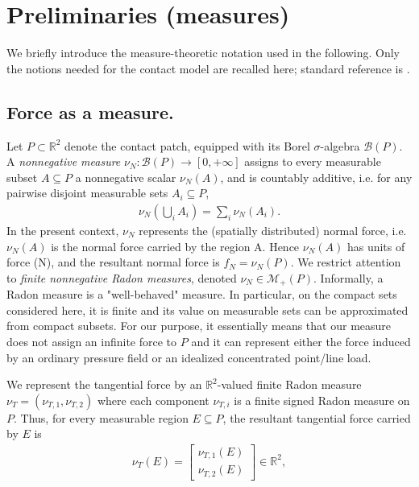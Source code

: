 \documentclass[11pt,a4paper]{article}
\theoremstyle{proposition}
\begin{document}
\section{Preliminaries (measures)}
\label{sec:measure-preliminaries}

We briefly introduce the measure-theoretic notation used in the following.
Only the notions needed for the contact model are recalled here; standard reference
is \cite{evans2015measure}.

\subsection{Force as a measure.}
Let $P\subset\mathbb R^2$ denote the contact patch, equipped with its Borel
$\sigma$-algebra $\mathcal B(P)$. A \textit{nonnegative measure} $\nu_N:\mathcal B(P)\rightarrow[0,+\infty]$ assigns to every measurable subset $A\subseteq P$ a nonnegative scalar $\nu_N(A)$, and is countably additive, i.e. for any pairwise disjoint measurable sets $A_i \subseteq P$,
\begin{align}
\nu_N\left(\bigcup_i A_i\right) =\sum_i \nu_N(A_i).
\end{align}
In the present context, $\nu_N$ represents the (spatially distributed) normal force, i.e. $\nu_N(A)$ is the normal force carried by the region A. Hence $\nu_N(A)$ has units of force (N), and the resultant normal force is $f_N=\nu_N(P)$. We restrict attention to \textit{finite nonnegative Radon measures}, denoted $\nu_N\in\mathcal M_+(P)$. Informally, a Radon measure is a "well-behaved" measure. In particular, on the compact sets considered here, it is finite and its value on measurable sets can be approximated from compact subsets. For our purpose, it essentially means that our measure does not assign an infinite force to $P$ and it can represent either the force induced by an ordinary pressure field or an idealized concentrated point/line load.

We represent the tangential force by an $\mathbb R^2$-valued finite Radon measure $\nu_T=(\nu_{T,1},\nu_{T,2})$ where each component $\nu_{T,i}$ is a finite signed Radon measure on $P$. Thus, for every measurable region $E\subseteq P$, the resultant tangential force carried by $E$ is
\begin{align}
    \nu_T(E)
    =
    \begin{bmatrix}
    \nu_{T,1}(E)\\
    \nu_{T,2}(E)
    \end{bmatrix}
    \in\mathbb R^2,
\end{align}
\end{document}
